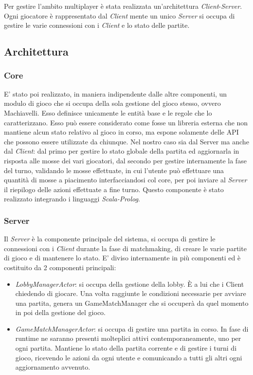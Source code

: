 Per gestire l'ambito multiplayer è stata realizzata un’architettura \textit{Client}-\textit{Server}.
Ogni giocatore è rappresentato dal \textit{Client} mente un unico \textit{Server} si occupa di gestire le varie connessioni con i \textit{Client} e lo stato delle partite.

\subsection[Architettura]{Architettura}

\subsubsection{Core}
E’ stato poi realizzato, in maniera indipendente dalle altre componenti, un modulo di gioco che si occupa della sola gestione del gioco stesso, ovvero Machiavelli.
Esso definisce unicamente le entità base e le regole che lo caratterizzano.
Esso può essere considerato come fosse un libreria esterna che non mantiene alcun stato relativo al gioco in corso, ma espone solamente delle API che possono essere utilizzate da chiunque.
Nel nostro caso sia dal Server ma anche dal \textit{Client}: dal primo per gestire lo stato globale della partita ed aggiornarla in risposta alle mosse dei vari giocatori, dal secondo per gestire internamente la fase del turno, validando le mosse effettuate, in cui l’utente può effettuare una quantità di mosse a piacimento interfacciandosi col core, per poi inviare al \textit{Server} il riepilogo delle azioni effettuate a fine turno.
Questo componente è stato realizzato integrando i linguaggi \textit{Scala-Prolog}.

\subsubsection{Server}
Il \textit{Server} è la componente principale del sistema, si occupa di gestire le connessioni con i \textit{Client} durante la fase di matchmaking, di creare le varie partite di gioco e di mantenere lo stato.
E’ diviso internamente in più componenti ed è costituito da 2 componenti principali:
\begin{itemize}
    \item \textit{LobbyManagerActor}: si occupa della gestione della lobby.
    È a lui che i Client chiedendo di giocare.
    Una volta raggiunte le condizioni necessarie per avviare una partita, genera un GameMatchManager che si occuperà da quel momento in poi della gestione del gioco.
    \item \textit{GameMatchManagerActor}: si occupa di gestire una partita in corso.
    In fase di runtime ne saranno presenti molteplici attivi contemporaneamente, uno per ogni partita.
    Mantiene lo stato della partita corrente e di gestire i turni di gioco, ricevendo le azioni da ogni utente e comunicando a tutti gli altri ogni aggiornamento avvenuto.
\end{itemize}

